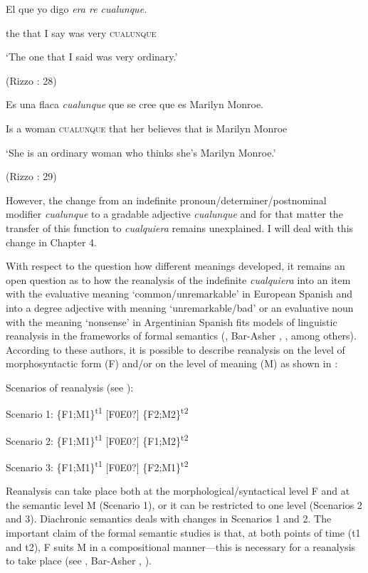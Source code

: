   El  que  yo  digo  \textit{era  re  cualunque.} 

  the  that  I  say  was  very  \textsc{cualunque} 

  ‘The one that I said was very ordinary.’

  (Rizzo \citealt{Salierno2013}: 28)

  Es  una  flaca  \textit{cualunque} que  se  cree  que  es  Marilyn Monroe.

  Is  a  woman  \textsc{cualunque} that  her  believes  that  is  Marilyn Monroe

  ‘She is an ordinary woman who thinks she’s Marilyn Monroe.’

  (Rizzo \citealt{Salierno2013}: 29)

However, the change from an indefinite pronoun/determiner/postnominal modifier \textit{cualunque} to a gradable adjective \textit{cualunque} and for that matter the transfer of this function to \textit{cualquiera} remains unexplained. I will deal with this change in Chapter 4. 

  With respect to the question how different meanings developed, it remains an open question as to how the reanalysis of the indefinite \textit{cualquiera} into an item with the evaluative meaning ‘common/unremarkable’ in European Spanish and into a degree adjective with meaning ‘unremarkable/bad’ or an evaluative noun with the meaning ‘nonsense’ in Argentinian Spanish fits models of linguistic reanalysis in the frameworks of formal semantics (\citealt{Eckardt2006}, Bar-Asher \citealt{Siegal2015}, \citealt{Aloni2021}, among others). According to these authors, it is possible to describe reanalysis on the level of morphosyntactic form (F) and/or on the level of meaning (M) as shown in :

\label{bkm:Ref65487536}  Scenarios of reanalysis (see \citealt{Aloni2021}):

  Scenario 1:    \{F1;M1\}\textsuperscript{t1} [F0E0?] \{F2;M2\}\textsuperscript{t2}

  Scenario 2:    \{F1;M1\}\textsuperscript{t1} [F0E0?] \{F1;M2\}\textsuperscript{t2}

  Scenario 3:    \{F1;M1\}\textsuperscript{t1} [F0E0?] \{F2;M1\}\textsuperscript{t2}

Reanalysis can take place both at the morphological/syntactical level F and at the semantic level M (Scenario 1), or it can be restricted to one level (Scenarios 2 and 3). Diachronic semantics deals with changes in Scenarios 1 and 2. The important claim of the formal semantic studies is that, at both points of time (t1 and t2), F suits M in a compositional manner—this is necessary for a reanalysis to take place (see \citealt{Eckardt2006}, Bar-Asher \citealt{Siegal2015}, \citealt{Aloni2021}).

